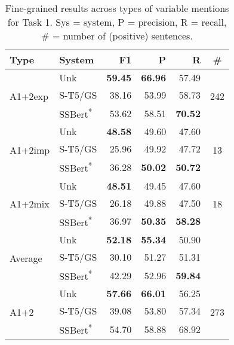 \documentclass[11pt]{article}
\begin{document}
\begin{table*}[]
    \centering
    \begin{tabular}{l|l|r|r|r|c}
    Type &     System &     F1 &      P &      R  &      \# \\
    \hline
    \hline
    \multirow{3}{4em}{A1+2exp} & Unk &  \textbf{59.45} &  \textbf{66.96} &  57.49 &  \multirow{3}{2em}{242} \\
       &  S-T5/GS &  38.16 &  53.99 &  58.73 &   \\
       &  SSBert\textsuperscript{*}  &  53.62 &  58.51 &  \textbf{70.52} &   \\
    \hline
    \multirow{3}{4em}{A1+2imp} & Unk &  \textbf{48.58} &  49.60 &  47.60 &  \multirow{3}{2em}{13} \\
       &  S-T5/GS &  25.96 &  49.92 &  47.72 &   \\
       &  SSBert\textsuperscript{*}  &  36.28 &  \textbf{50.02} &  \textbf{50.72} &   \\
    \hline
    \multirow{3}{4em}{A1+2mix} & Unk &  \textbf{48.51} &  49.45 &  47.60 &  \multirow{3}{2em}{18} \\
       &  S-T5/GS &  26.18 &  49.88 &  47.50 &   \\
       &  SSBert\textsuperscript{*}  &  36.97 &  \textbf{50.35} &  \textbf{58.28} &   \\
    \hline
    \multirow{3}{4em}{Average} & Unk &  \textbf{52.18} &  \textbf{55.34} &  50.90 &   \\
       &  S-T5/GS &  30.10 &  51.27 &  51.31 &   \\
       &  SSBert\textsuperscript{*}  &  42.29 &  52.96 &  \textbf{59.84} &   \\
    \hline
    \multirow{3}{4em}{A1+2} & Unk &  \textbf{57.66} &  \textbf{66.01} &  56.25  &  \multirow{3}{2em}{273} \\
       &    S-T5/GS  &  39.08 &  53.80 &  57.34  &   \\
        &    SSBert\textsuperscript{*}  &  54.70 &  58.88 &  68.92  &   \\
    \hline
    \end{tabular}
    \caption{Fine-grained results across types of variable mentions for Task 1. Sys = system, P = precision, R = recall, \# = number of (positive) sentences.}
    \label{tab:T1-Ann12}
\end{table*}
\end{document}
